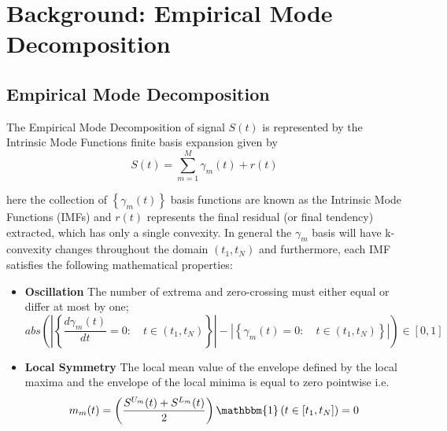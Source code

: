 \section{Background: Empirical Mode Decomposition}\label{sec:EMD_background}

\subsection{Empirical Mode Decomposition}

\begin{Definition}

The Empirical Mode Decomposition of signal $S(t)$ is represented by the Intrinsic Mode Functions finite basis expansion given by
\begin{equation}
\label{EMD-for}
S(t) = \sum_{m=1}^M \gamma_m \left(t\right) + r \left(t \right)
\end{equation}

here the collection of $\left\{\gamma_m(t)\right\}$ basis functions are known as the Intrinsic Mode Functions (IMFs) and $r \left(t \right)$ represents the final residual (or final tendency) extracted, which has only a single convexity. In general the $\gamma_m$ basis will have k-convexity changes throughout the domain $(t_1, t_N)$ and furthermore, each IMF satisfies the following mathematical properties:
\begin{itemize}
\item \textbf{Oscillation} The number of extrema and zero-crossing must either equal or differ at most by one;
\begin{equation}
abs \left( \left| \left\{ \frac{d \gamma_m (t)}{dt} = 0 : \quad t \in \left( t_1, t_N \right) \right\} \right| - \left| \left\{ \gamma_m (t) = 0 : \quad t \in \left( t_1, t_N \right) \right\} \right| \right)  \in  \left[ 0, 1 \right]
\end{equation}
\item \textbf{Local Symmetry} The local mean value of the envelope defined by the local maxima and the envelope of the local minima is equal to zero pointwise i.e.   
\begin{equation}
\label{mean_env}
m_m(t) = \left(\frac{S^{U_m} (t) + S^{L_m} (t)}{2} \right) \mathbbm{1} \left( t \in [t_1, t_N] \right) = 0
\end{equation}


\end{itemize}
\end{Definition}

